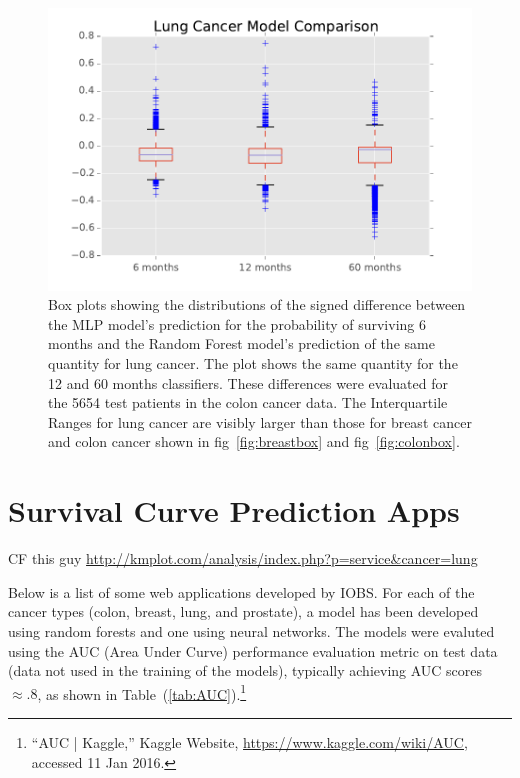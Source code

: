 \documentclass[a4paper,11pt]{article}
\begin{document}
\begin{figure}[tbp]
\centering 
\begin{center}
\includegraphics[width=.90\textwidth,origin=c]{lungbox.pdf}
\caption{\label{fig:lungbox} Box plots showing the distributions of the signed difference between the MLP model's prediction for the probability of surviving 6 months and the Random Forest model's prediction of the same quantity for lung cancer. The plot shows the same quantity for the 12 and 60 months classifiers. These differences were evaluated for the 5654 test patients in the colon cancer data. The Interquartile Ranges for lung cancer are visibly larger than those for breast cancer and colon cancer shown in fig~\ref{fig:breastbox} and fig~\ref{fig:colonbox}.}
\end{center}
\end{figure}










\section{Survival Curve Prediction Apps}
\label{sec:apps}


CF this guy \url{http://kmplot.com/analysis/index.php?p=service&cancer=lung}


Below is a list of some web applications developed by IOBS.
For each of the cancer types (colon, breast, lung, and prostate), a model has been developed using random forests and one using neural networks. The models were evaluted using the AUC (Area Under Curve) performance evaluation metric on test data (data not used in the training of the models), typically achieving AUC scores  $\approx .8$, as shown in Table~(\ref{tab:AUC}).\footnote{``AUC | Kaggle,'' Kaggle Website, \url{https://www.kaggle.com/wiki/AUC}, accessed 11 Jan 2016.}
\end{document}
